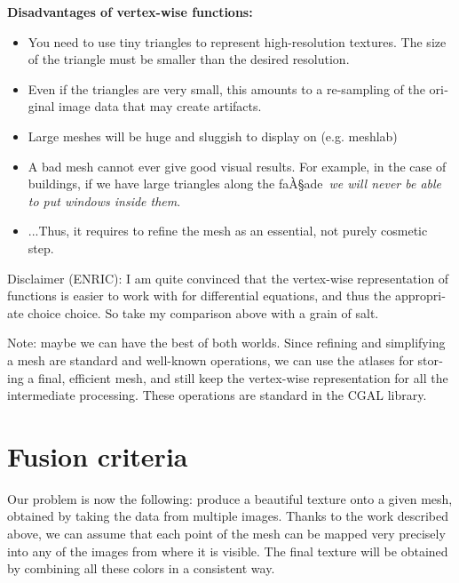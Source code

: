 \documentclass{article}
\def\R{\mathbf{R}} %
\begin{document}
\begin{otherlanguage}{british}
{\bf Disadvantages of vertex-wise functions:}

\begin{itemize}
	\item You need to use tiny triangles to represent high-resolution
		textures.  The size of the triangle must be smaller than the
		desired resolution.
	\item Even if the triangles are very small, this amounts to a
		re-sampling of the original image data that may create
		artifacts.
	\item Large meshes will be huge and sluggish to display on (e.g.
		meshlab)
	\item A bad mesh cannot ever give good visual results.  For example,
		in the case of buildings, if we have large triangles along
		the faÀ§ade~\emph{we will never be able to put windows inside
		them}.
	\item ...Thus, it requires to refine the mesh as an essential, not
		purely cosmetic step.
\end{itemize}

Disclaimer (ENRIC): I am quite convinced that the vertex-wise representation
of functions is easier to work with for differential equations, and thus the
appropriate choice choice.  So take my comparison above with a grain of salt.

Note: maybe we can have the best of both worlds.  Since refining and
simplifying a mesh are standard and well-known operations, we can use the
atlases for storing a final, efficient mesh, and still keep the vertex-wise
representation for all the intermediate processing.  These operations are
standard in the CGAL library.

\end{otherlanguage}



%
%
%








\clearpage
\section{Fusion criteria}

Our problem is now the following: produce a beautiful texture onto a given
mesh, obtained by taking the data from multiple images.  Thanks to the work
described above, we can assume that each point of the mesh can be mapped very
precisely into any of the images from where it is visible.  The final texture
will be obtained by combining all these colors in a consistent way.
\end{document}
